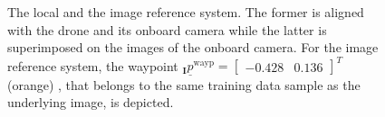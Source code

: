 \begin{figure}[h]
    \centering
    \caption[
        The local and the image reference system
    ]{
        The local and the image reference system. The former is
        aligned with the drone and its onboard camera 
        while the latter is superimposed on the images of the onboard camera.
        For the image reference system,
        the waypoint
        ${}_\textbf{I}\underline p^\text{wayp} = \begin{bmatrix}
            -0.428 & 0.136
        \end{bmatrix}^T$
        (orange)
        , that belongs to the same training data sample as the underlying image,
        is depicted.
        \label{fig:local_and_image_reference_system}
    }
\end{figure}





